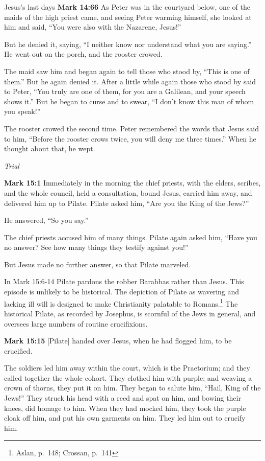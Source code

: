 \documentclass[10pt,twoside]{article} %
\newcommand{\quotesize}{\normalsize{}}
\newcommand{\comm}[1]{\begingroup \color{black!50} #1\endgroup}
\newenvironment{quotetext}{\begingroup\quotesize}{\endgroup}
\newcommand{\bible}[2]{\begin{quotetext}\textbf{#1} #2\end{quotetext}}
\newcommand{\gospelmark}[2]{\bible{Mark #1}{#2}}
\newcommand{\subhead}[1]{\emph{#1}\par}
\begin{document}
\begin{section}{Jesus's last days}
\gospelmark{14:66}{
  As Peter was in the courtyard below, one of the maids of the high priest came,   and seeing Peter warming himself, she looked at him and said, ``You were also with the Nazarene, Jesus!''

  But he denied it, saying, ``I neither know nor understand what you are saying.'' He went out on the porch, and the rooster crowed.

  The maid saw him and began again to tell those who stood by, ``This is one of them.''   But he again denied it. After a little while again those who stood by said to Peter, ``You truly are one of them, for you are a Galilean, and your speech shows it.''\label{peter-accent}
   But he began to curse and to swear, ``I don't know this man of whom you speak!''

  The rooster crowed the second time. Peter remembered the words that Jesus said to him, ``Before the rooster crows twice, you will deny me three times.'' When he thought about that, he wept. 
}

\subhead{Trial}

\gospelmark{15:1}{
Immediately in the morning the chief priests, with the elders, scribes, and the whole council, held a consultation, bound Jesus, carried him away, and delivered him up to Pilate.   Pilate asked him, ``Are you the King of the Jews?''

He answered, ``So you say.''

  The chief priests accused him of many things.   Pilate again asked him, ``Have you no answer? See how many things they testify against you!''

  But Jesus made no further answer, so that Pilate marveled. 
}

\comm{In Mark 15:6-14 Pilate pardons the robber Barabbas rather than Jesus. This episode is unlikely to be historical.
The depiction of Pilate as wavering and lacking ill will is designed to make Christianity palatable to Romans.\footnote{Aslan, p.~148; Crossan,
p.~141} The historical Pilate, as recorded by Josephus, is scornful of the Jews in general, and oversees large numbers
of routine crucifixions.
}

\gospelmark{15:15}{
[Pilate] handed over Jesus, when he had flogged him, to be crucified.

  The soldiers led him away within the court, which is the Praetorium; and they called together the whole cohort.   They clothed him with purple; and weaving a crown of thorns, they put it on him.   They began to salute him, ``Hail, King of the Jews!''   They struck his head with a reed and spat on him, and bowing their knees, did homage to him.   When they had mocked him, they took the purple cloak off him, and put his own garments on him. They led him out to crucify him.

}
\end{section}
\end{document}
